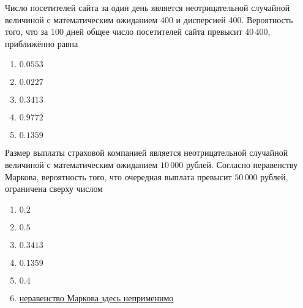 \documentclass[t]{beamer}
\begin{document}
 \begin{frame} \label{18} 
\begin{block}{18} 

  Число посетителей сайта за один день является неотрицательной случайной величиной с математическим ожиданием 400 и дисперсией 400. Вероятность того, что за 100 дней общее число посетителей сайта превысит $40\,400$, приближённо равна
  


 \end{block} 
\begin{enumerate} 
\item[] \hyperlink{18-No}{\beamergotobutton{} $0.0553$}
\item[] \hyperlink{18-Yes}{\beamergotobutton{} $0.0227$}
\item[] \hyperlink{18-No}{\beamergotobutton{} $0.3413$}
\item[] \hyperlink{18-No}{\beamergotobutton{} $0.9772$}
\item[] \hyperlink{18-No}{\beamergotobutton{} $0.1359$}
\end{enumerate} 
\end{frame} 


 \begin{frame} \label{19} 
\begin{block}{19} 

Размер выплаты страховой компанией является неотрицательной случайной величиной с математическим ожиданием $10\,000$ рублей. Согласно неравенству Маркова, вероятность того, что очередная выплата превысит $50\,000$ рублей, ограничена сверху числом
  


 \end{block} 
\begin{enumerate} 
\item[] \hyperlink{19-Yes}{\beamergotobutton{} $0.2$}
\item[] \hyperlink{19-No}{\beamergotobutton{} $0.5$}
\item[] \hyperlink{19-No}{\beamergotobutton{} $0.3413$}
\item[] \hyperlink{19-No}{\beamergotobutton{} $0.1359$}
\item[] \hyperlink{19-No}{\beamergotobutton{} $0.4$}
\item[] \hyperlink{19-No}{\beamergotobutton{} неравенство Маркова здесь неприменимо}
\end{enumerate} 
\end{frame} 
\end{document}
